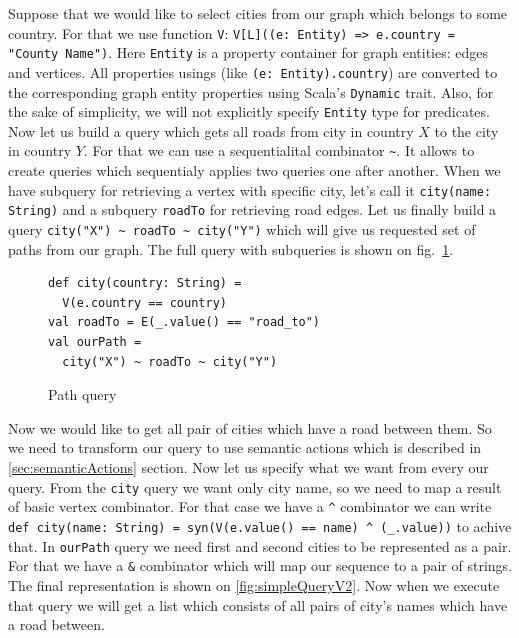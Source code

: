 Suppose that we would like to select cities from our graph which belongs to some country. 
For that we use function \lstinline{V}: \lstinline{V[L]((e: Entity) => e.country = "County Name")}.
Here \lstinline{Entity} is a property container for graph entities: edges and vertices. 
All properties usings (like \lstinline{(e: Entity).country}) are converted to the corresponding graph entity properties using Scala's \lstinline{Dynamic} trait.
Also, for the sake of simplicity, we will not explicitly specify \lstinline{Entity} type for predicates. 
Now let us build a query which gets all roads from city in country $X$ to the city in country $Y$. 
For that we can use a sequentialital combinator \lstinline{~}. 
It allows to create queries which sequentialy applies two queries one after another. 
When we have subquery for retrieving a vertex with specific city, let's call it \lstinline{city(name: String)} and a subquery \lstinline{roadTo} for retrieving road edges. 
Let us finally build a query \lstinline{city("X") ~ roadTo ~ city("Y")} which will give us requested set of paths from our graph.
The full query with subqueries is shown on fig.~\ref{fig:simpleQuery}.

\begin{figure}[h]
\begin{lstlisting}
def city(country: String) =
  V(e.country == country)
val roadTo = E(_.value() == "road_to")
val ourPath = 
  city("X") ~ roadTo ~ city("Y")
\end{lstlisting}
\caption{Path query}
\label{fig:simpleQuery}
\end{figure}



Now we would like to get all pair of cities which have a road between them. 
So we need to transform our query to use semantic actions which is described in \ref{sec:semanticActions} section. 
Now let us specify what we want from every our query. 
From the \lstinline{city} query we want only city name, so we need to map a result of basic vertex combinator. 
For that case we have a \lstinline{^} combinator we can write \lstinline{def city(name: String) = syn(V(e.value() == name) ^ (_.value))} to achive that. 
In \lstinline{ourPath} query we need first and second cities to be represented as a pair. 
For that we have a \lstinline{&} combinator which will map our sequence to a pair of strings.
The final representation is shown on \ref{fig:simpleQueryV2}. 
Now when we execute that query we will get a list which consists of all pairs of city's names which have a road between.


